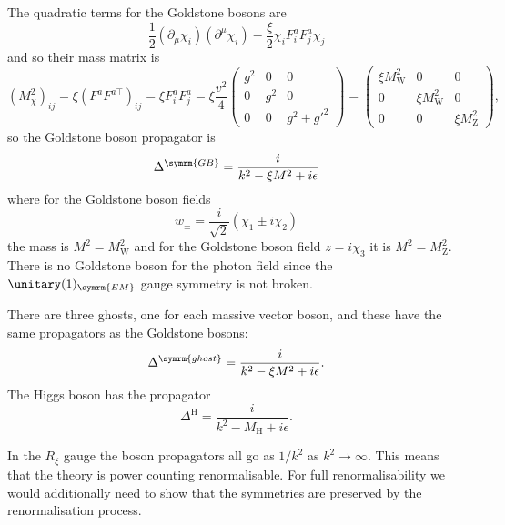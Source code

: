 \documentclass[fleqn]{NotesClass}
\newcommand{\Pparticle}[1]{\mathrm{#1}}
\newcommand{\PZ}{\ensuremath{\Pparticle{Z}}}
\newcommand{\PW}{\ensuremath{\Pparticle{W}}}
\newcommand{\Phiggs}{\ensuremath{\Pparticle{H}}}
\newcommand{\trans}{\top}
\begin{document}
    The quadratic terms for the Goldstone bosons are
    \begin{equation}
        \frac{1}{2}(\partial_\mu \chi_i)(\partial^\mu \chi_i) - \frac{\xi}{2} \chi_i F^a_i F^a_j \chi_j
    \end{equation}
    and so their mass matrix is
    \begin{equation}
        (M_\chi^2)_{ij} = \xi(F^a F^{a\trans})_{ij} = \xi F^a_i F^a_j = \xi \frac{v^2}{4}
        \begin{pmatrix}
            g^2 & 0 & 0\\
            0 & g^2 & 0\\
            0 & 0 & g^2 + g'^2
        \end{pmatrix}
        =
        \begin{pmatrix}
            \xi M_{\PW}^2 & 0 & 0\\
            0 & \xi M_{\PW}^2 & 0\\
            0 & 0 & \xi M_{\PZ}^2
        \end{pmatrix}
        ,
    \end{equation}
    so the Goldstone boson propagator is
    \begin{equation}
        \Delta^{\symrm{GB}} = \frac{i}{k^2 - \xi M^2 + i\epsilon}
    \end{equation}
    where for the Goldstone boson fields
    \begin{equation}
        w_{\pm} = \frac{i}{\sqrt{2}}(\chi_1 \pm i \chi_2)
    \end{equation}
    the mass is \(M^2 = M_{\PW}^2\) and for the Goldstone boson field \(z = i\chi_3\) it is \(M^2 = M_{\PZ}^2\).
    There is no Goldstone boson for the photon field since the \(\unitary(1)_{\symrm{EM}}\) gauge symmetry is not broken.
    
    There are three ghosts, one for each massive vector boson, and these have the same propagators as the Goldstone bosons:
    \begin{equation}
        \Delta^{\symrm{ghost}} = \frac{i}{k^2 - \xi M^2 + i\epsilon}.
    \end{equation}
    The Higgs boson has the propagator
    \begin{equation}
        \Delta^{\Phiggs} = \frac{i}{k^2 - M_{\Phiggs} + i\epsilon}.
    \end{equation}
    
    In the \(R_\xi\) gauge the boson propagators all go as \(1/k^2\) as \(k^2 \to \infty\).
    This means that the theory is power counting renormalisable.
    For full renormalisability we would additionally need to show that the symmetries are preserved by the renormalisation process.
    
\end{document}
